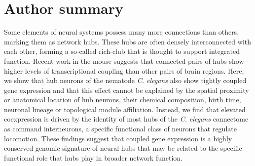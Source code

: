 \documentclass[10pt,letterpaper]{article}
\begin{document}



\section*{Author summary}

Some elements of neural systems possess many more connections than others, marking them as network hubs.
These hubs are often densely interconnected with each other, forming a so-called rich-club that is thought to support integrated function.
Recent work in the mouse suggests that connected pairs of hubs show higher levels of transcriptional coupling than other pairs of brain regions.
Here, we show that hub neurons of the nematode \textit{C. elegans} also show tightly coupled gene expression and that this effect cannot be explained by the spatial proximity or anatomical location of hub neurons, their chemical composition, birth time, neuronal lineage or topological module affiliation.
Instead, we find that elevated coexpression is driven by the identity of most hubs of the \textit{C. elegans} connectome as command interneurons, a specific functional class of neurons that regulate locomotion.
These findings suggest that coupled gene expression is a highly conserved genomic signature of neural hubs that may be related to the specific functional role that hubs play in broader network function.
\end{document}
